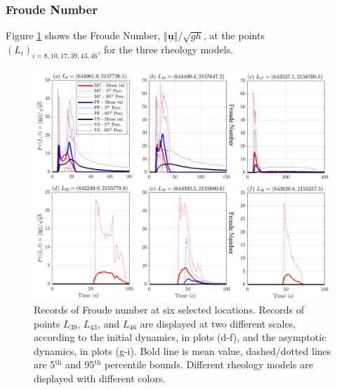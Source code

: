 \documentclass{article}
\begin{document}
\subsubsection{Froude Number}
Figure \ref{fig:Colima-Fr1} shows the Froude Number, $\Vert \underline{\mathbf{u}} \Vert/\sqrt{gh}$, at the points $(L_i)_{i=8,10,17,39,43,46}$, for the three rheology models.
\begin{figure}[H]
         \centering
        \includegraphics[width=1\textwidth]{BAF_VolcanDeColima/LocalMeasurments/Froude12.png}
        \caption{Records of Froude number at six selected locations. Records of points $L_{39}$, $L_{43}$, and $L_{46}$ are displayed at two different scales, according to the initial dynamics, in plots (d-f), and the asymptotic dynamics, in plots (g-i). Bold line is mean value, dashed/dotted lines are 5$^{\mathrm{th}}$ and 95$^{\mathrm{th}}$ percentile bounds. Different rheology models are displayed with different colors.}
        \label{fig:Colima-Fr1}
\end{figure}
\end{document}
